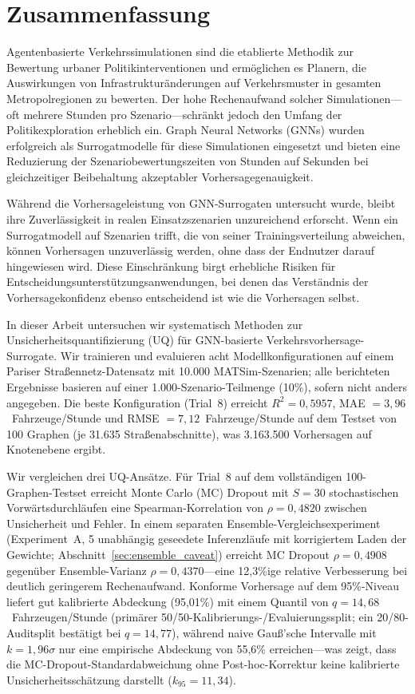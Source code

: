 \chapter{Zusammenfassung}

Agentenbasierte Verkehrssimulationen sind die etablierte Methodik zur Bewertung urbaner Politikinterventionen und ermöglichen es Planern, die Auswirkungen von Infrastrukturänderungen auf Verkehrsmuster in gesamten Metropolregionen zu bewerten. Der hohe Rechenaufwand solcher Simulationen---oft mehrere Stunden pro Szenario---schränkt jedoch den Umfang der Politikexploration erheblich ein. Graph Neural Networks (GNNs) wurden erfolgreich als Surrogatmodelle für diese Simulationen eingesetzt und bieten eine Reduzierung der Szenariobewertungszeiten von Stunden auf Sekunden bei gleichzeitiger Beibehaltung akzeptabler Vorhersagegenauigkeit.

Während die Vorhersageleistung von GNN-Surrogaten untersucht wurde, bleibt ihre Zuverlässigkeit in realen Einsatzszenarien unzureichend erforscht. Wenn ein Surrogatmodell auf Szenarien trifft, die von seiner Trainingsverteilung abweichen, können Vorhersagen unzuverlässig werden, ohne dass der Endnutzer darauf hingewiesen wird. Diese Einschränkung birgt erhebliche Risiken für Entscheidungsunterstützungsanwendungen, bei denen das Verständnis der Vorhersagekonfidenz ebenso entscheidend ist wie die Vorhersagen selbst.

In dieser Arbeit untersuchen wir systematisch Methoden zur Unsicherheitsquantifizierung (UQ) für GNN-basierte Verkehrsvorhersage-Surrogate. Wir trainieren und evaluieren acht Modellkonfigurationen auf einem Pariser Straßennetz-Datensatz mit 10.000 MATSim-Szenarien; alle berichteten Ergebnisse basieren auf einer 1.000-Szenario-Teilmenge (10\%), sofern nicht anders angegeben. Die beste Konfiguration (Trial~8) erreicht $R^2 = 0{,}5957$, MAE $= 3{,}96$~Fahrzeuge/Stunde und RMSE $= 7{,}12$~Fahrzeuge/Stunde auf dem Testset von 100 Graphen (je 31.635 Straßenabschnitte), was 3.163.500 Vorhersagen auf Knotenebene ergibt.

Wir vergleichen drei UQ-Ansätze. Für Trial~8 auf dem vollständigen 100-Graphen-Testset erreicht Monte Carlo (MC) Dropout mit $S = 30$ stochastischen Vorwärtsdurchläufen eine Spearman-Korrelation von $\rho = 0{,}4820$ zwischen Unsicherheit und Fehler. In einem separaten Ensemble-Vergleichsexperiment (Experiment~A, 5 unabhängig geseedete Inferenzläufe mit korrigiertem Laden der Gewichte; Abschnitt~\ref{sec:ensemble_caveat}) erreicht MC Dropout $\rho = 0{,}4908$ gegenüber Ensemble-Varianz $\rho = 0{,}4370$---eine 12{,}3\%ige relative Verbesserung bei deutlich geringerem Rechenaufwand. Konforme Vorhersage auf dem 95\%-Niveau liefert gut kalibrierte Abdeckung (95,01\%) mit einem Quantil von $q = 14{,}68$~Fahrzeugen/Stunde (primärer 50/50-Kalibrierungs-/Evaluierungssplit; ein 20/80-Auditsplit bestätigt bei $q = 14{,}77$), während naive Gauß'sche Intervalle mit $k = 1{,}96\sigma$ nur eine empirische Abdeckung von 55,6\% erreichen---was zeigt, dass die MC-Dropout-Standardabweichung ohne Post-hoc-Korrektur keine kalibrierte Unsicherheitsschätzung darstellt ($k_{95} = 11{,}34$).

